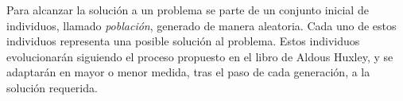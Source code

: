 Para alcanzar la solución a un problema se parte de un conjunto inicial de individuos, llamado \textit{población},
generado de manera aleatoria. Cada uno de estos individuos representa una posible solución al problema. Estos individuos
evolucionarán siguiendo el proceso propuesto en el libro de Aldous Huxley, y se adaptarán en mayor o menor medida,
tras el paso de cada generación, a la solución requerida.

